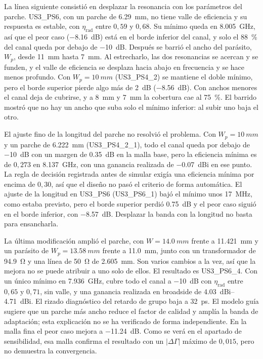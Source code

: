 \documentclass[11pt,a4paper]{article}
\begin{document}
La línea siguiente consistió en desplazar la resonancia con los parámetros del parche. US3\_PS6, con
un parche de \SI{6.29}{mm}, no tiene valle de eficiencia y su respuesta es estable, con
$\eta_\mathrm{rad}$ entre $0{,}59$ y $0{,}68$. Su mínimo queda en \SI{8.005}{GHz}, así que el peor
caso (\SI{-8.16}{dB}) está en el borde inferior del canal, y solo el \SI{88}{\percent} del canal queda por debajo de
\SI{-10}{dB}. Después se barrió el ancho del parásito, $W_p$, desde \SI{11}{mm} hasta \SI{7}{mm}. Al
estrecharlo, las dos resonancias se acercan y se funden, y el valle de eficiencia se desplaza hacia
abajo en frecuencia y se hace menos profundo. Con $W_p = \SI{10}{mm}$ (US3\_PS4\_2) se mantiene el
doble mínimo, pero el borde superior pierde algo más de \SI{2}{dB} (\SI{-8.56}{dB}). Con anchos menores
el canal deja de cubrirse, y a \SI{8}{mm} y \SI{7}{mm} la cobertura cae al \SI{75}{\percent}. El barrido
mostró que no hay un ancho que suba solo el mínimo inferior: al subir uno baja el otro.

El ajuste fino de la longitud del parche no resolvió el problema. Con $W_p = \SI{10}{mm}$ y un parche
de \SI{6.222}{mm} (US3\_PS4\_2\_1), todo el canal queda por debajo de \SI{-10}{dB} con un margen de
\SI{0.35}{dB} en la malla base, pero la eficiencia mínima es de $0{,}273$ en \SI{8.137}{GHz}, con
una ganancia realizada de \SI{-0.07}{dBi} en ese punto. La regla de decisión registrada antes de
simular exigía una eficiencia mínima por encima de $0{,}30$, así que el diseño no pasó el criterio
de forma automática. El ajuste de la longitud en US3\_PS6 (US3\_PS6\_1) bajó el mínimo unos
\SI{17}{MHz}, como estaba previsto, pero el borde superior perdió \SI{0.75}{dB} y el peor caso
siguió en el borde inferior, con \SI{-8.57}{dB}. Desplazar la banda con la longitud no basta para
ensancharla.

La última modificación amplió el parche, con $W = \SI{14.0}{mm}$ frente a \SI{11.421}{mm} y un
parásito de $W_p = \SI{13.58}{mm}$ frente a \SI{11.0}{mm}, junto con un transformador de
\SI{94.9}{\ohm} y una línea de \SI{50}{\ohm} de \SI{2.605}{mm}. Son varios cambios a la vez, así que la
mejora no se puede atribuir a uno solo de ellos. El resultado es US3\_PS6\_4. Con un único mínimo en
\SI{7.936}{GHz}, cubre todo el canal a \SI{-10}{dB} con $\eta_\mathrm{rad}$ entre $0{,}65$ y
$0{,}71$, sin valle, y una ganancia realizada en broadside de \SIrange{4.03}{4.71}{dBi}. El rizado
diagnóstico del retardo de grupo baja a \SI{32}{ps}. El modelo guía sugiere que un parche más ancho reduce el factor de calidad y amplía la banda de adaptación; esta explicación no se ha verificado de forma independiente. En la malla fina el peor caso mejora a \SI{-11.24}{dB}.
Como se verá en el apartado de sensibilidad, esa malla confirma el resultado con un $|\Delta\Gamma|$
máximo de $0{,}015$, pero no demuestra la convergencia.
\end{document}
